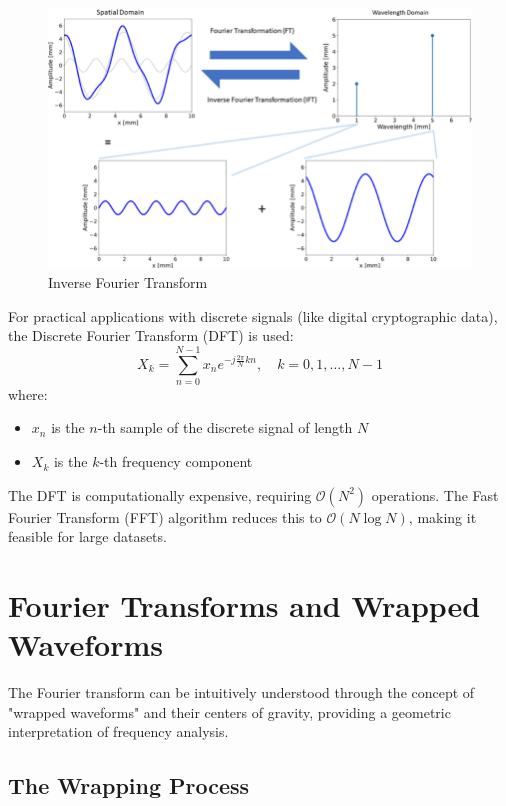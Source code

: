 \documentclass{article}
\begin{document}
\begin{figure}[!ht]
    \centering
    \includegraphics[width=\textwidth]{./pics/inverse-fourier-transform.png}
    \caption{Inverse Fourier Transform}
    \label{fig:inv_fourier_transform}
\end{figure}

For practical applications with discrete signals (like digital cryptographic data), the Discrete Fourier Transform (DFT) is used:
\[
    X_k = \sum_{n=0}^{N-1} x_n e^{-j \frac{2\pi}{N} kn}, \quad k = 0,1,\ldots,N-1
\]
where:
\begin{itemize}
    \item $x_n$ is the $n$-th sample of the discrete signal of length $N$
    \item $X_k$ is the $k$-th frequency component
\end{itemize}

The DFT is computationally expensive, requiring $\mathcal{O}(N^2)$ operations. The Fast Fourier Transform (FFT) algorithm reduces this to $\mathcal{O}(N \log N)$, making it feasible for large datasets.




\section{Fourier Transforms and Wrapped Waveforms}

The Fourier transform can be intuitively understood through the concept of "wrapped waveforms" and their centers of gravity, providing a geometric interpretation of frequency analysis.

\subsection{The Wrapping Process}
\end{document}
